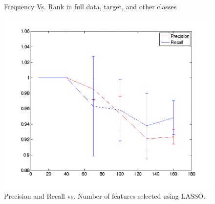 \begin{center}
\begin{figure}[!ht]
\centering
{}
\caption{Frequency Vs. Rank in full data, target, and other classes}
\label{fig:largecompare}
\end{figure}
\end{center}

\begin{center}
\begin{figure}[!ht]
\centering
\includegraphics[width=.7\textwidth]{../images/precisionrecallExpansion.png}
\caption{Precision and Recall vs. Number of features selected using LASSO.}
\label{fig:prec recall}
\end{figure}
\end{center}

